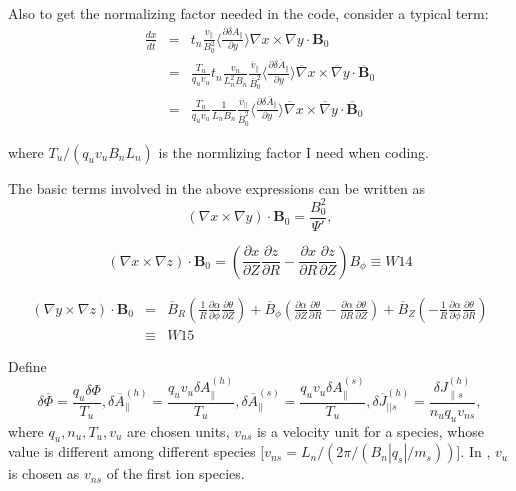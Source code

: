 \documentclass{llncs}
\newcommand{\tmtexttt}[1]{\text{{\ttfamily{#1}}}}
\begin{document}
Also to get the normalizing factor needed in the code, consider a typical
term:
\begin{eqnarray}
  \frac{d x}{d \overline{t}} & = & t_n \frac{v_{\parallel}}{B_0^2} \langle
  \frac{\partial \delta A_{\parallel}}{\partial y} \rangle \nabla x \times
  \nabla y \cdot \mathbf{B}_0 \nonumber\\
  & = & \frac{T_u}{q_u v_u} t_n \frac{v_n}{L_n^2 B_n}
  \frac{\overline{v}_{\parallel}}{\overline{B}_0^2} \langle \frac{\partial
  \delta \overline{A}_{\parallel}}{\partial y} \rangle \overline{\nabla} x
  \times \overline{\nabla} y \cdot \overline{\mathbf{B}}_0 \nonumber\\
  & = & \frac{T_u}{q_u v_u} \frac{1}{L_n B_n}
  \frac{\overline{v}_{\parallel}}{\overline{B}_0^2} \langle \frac{\partial
  \delta \overline{A}_{\parallel}}{\partial y} \rangle \overline{\nabla} x
  \times \overline{\nabla} y \cdot \overline{\mathbf{B}}_0 
\end{eqnarray}


where $T_u / (q_u v_u B_n L_n)$ is the normlizing factor I need when coding.

The basic terms involved in the above expressions can be written as
\begin{equation}
  (\nabla x \times \nabla y) \cdot \mathbf{B}_0 = \frac{B_0^2}{\Psi'},
\end{equation}

\begin{equation}
  (\nabla x \times \nabla z) \cdot \mathbf{B}_0 = \left( \frac{\partial
  x}{\partial Z} \frac{\partial z}{\partial R} - \frac{\partial x}{\partial R}
  \frac{\partial z}{\partial Z} \right) B_{\phi} \equiv W 14
\end{equation}

\begin{eqnarray}
  (\nabla y \times \nabla z) \cdot \mathbf{B}_0 & = & \overline{B}_R \left(
  \frac{1}{R}  \frac{\partial \alpha}{\partial \phi} \frac{\partial
  \theta}{\partial Z} \right) + \overline{B}_{\phi} \left( \frac{\partial
  \alpha}{\partial Z} \frac{\partial \theta}{\partial R} - \frac{\partial
  \alpha}{\partial R} \frac{\partial \theta}{\partial Z} \right) +
  \overline{B}_Z \left( - \frac{1}{R}  \frac{\partial \alpha}{\partial \phi}
  \frac{\partial \theta}{\partial R} \right) \nonumber\\
  & \equiv & W 15 
\end{eqnarray}


Define
\begin{equation}
  \delta \overline{\Phi} = \frac{q_u \delta \Phi}{T_u}, \delta
  \overline{A}_{\parallel}^{(h)} = \frac{q_u v_u \delta
  A_{\parallel}^{(h)}}{T_u}, \delta \overline{A}_{\parallel}^{(s)} = \frac{q_u
  v_u \delta A_{\parallel}^{(s)}}{T_u}, \delta \overline{J}_{|| s}^{(h)} =
  \frac{\delta J_{\parallel s}^{(h)}}{n_u q_u v_{n s}},
\end{equation}
where $q_u, n_u, T_u, v_u$ are chosen units, $v_{n s}$ is a velocity unit for
a species, whose value is different among different species [$v_{n s} = L_n /
(2 \pi / (B_n | q_s | / m_s))$]. In \tmtexttt{TEK}, $v_u$ is chosen as $v_{n
s}$ of the first ion species.
\end{document}
